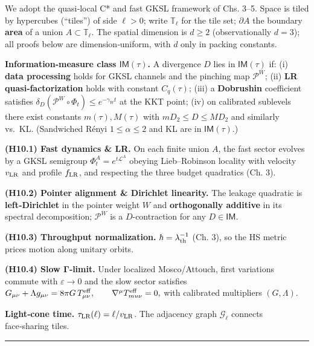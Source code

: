 \documentclass[
]{article}
\numberwithin{equation}{section}
\begin{document}
We adopt the quasi‑local C* and fast GKSL framework of Chs. 3--5. Space
is tiled by hypercubes (``tiles'') of side \(\ell>0\); write
\(\mathbb T_\ell\) for the tile set; \(\partial A\) the boundary
\textbf{area} of a union \(A\subset\mathbb T_\ell\). The spatial
dimension is \(d\ge2\) (observationally \(d=3\)); all proofs below are
dimension‑uniform, with \(d\) only in packing constants.

\textbf{Information‑measure class \(\mathsf{IM}(\tau)\).} A divergence
\(D\) lies in \(\mathsf{IM}(\tau)\) if: (i) \textbf{data processing}
holds for GKSL channels and the pinching map \(\mathcal P^W\); (ii)
\textbf{LR quasi‑factorization} holds with constant \(C_q(\tau)\); (iii)
a \textbf{Dobrushin} coefficient satisfies
\(\delta_D(\mathcal P^W\!\circ\!\Phi_t)\le e^{-\gamma_W t}\) at the KKT
point; (iv) on calibrated sublevels there exist constants
\(m(\tau),M(\tau)\) with \(m D_2\le D\le M D_2\) and similarly vs.~KL.
(Sandwiched Rényi \(1\le\alpha\le2\) and KL are in
\(\mathsf{IM}(\tau)\).)

\textbf{(H10.1) Fast dynamics \& LR.} On each finite union \(A\), the
fast sector evolves by a GKSL semigroup \(\Phi_t^A=e^{t\mathcal L^A}\)
obeying Lieb--Robinson locality with velocity \(v_{\rm LR}\) and profile
\(f_{\rm LR}\), and respecting the three budget quadratics (Ch. 3).

\textbf{(H10.2) Pointer alignment \& Dirichlet linearity.} The leakage
quadratic is \textbf{left‑Dirichlet} in the pointer weight \(W\) and
\textbf{orthogonally additive} in its spectral decomposition;
\(\mathcal P^W\) is a \(D\)-contraction for any \(D\in\mathsf{IM}\).

\textbf{(H10.3) Throughput normalization.}
\(\hbar=\lambda_{\rm th}^{-1}\) (Ch. 3), so the HS metric prices motion
along unitary orbits.

\textbf{(H10.4) Slow Γ‑limit.} Under localized Mosco/Attouch, first
variations commute with \(\varepsilon\to0\) and the slow sector
satisfies
\(G_{\mu\nu}+\Lambda g_{\mu\nu}=8\pi G\,T^{\rm eff}_{\mu\nu},\qquad \nabla^\mu T^{\rm eff}_{\\mu\nu}=0,\)
with calibrated multipliers \((G,\Lambda)\).

\textbf{Light‑cone time.} \(\tau_{\rm LR}(\ell)=\ell/v_{\rm LR}\). The
adjacency graph \(\mathcal G_\ell\) connects face‑sharing tiles.

\begin{center}\rule{0.5\linewidth}{0.5pt}\end{center}
\end{document}
